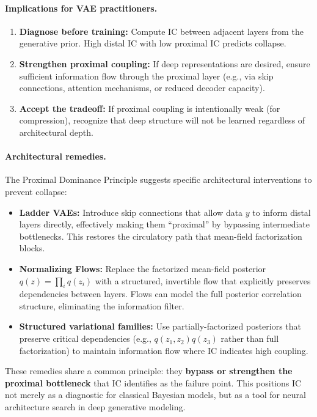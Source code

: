 \documentclass[10pt]{article} %
\theoremstyle{plain}
\theoremstyle{definition}
\begin{document}
\paragraph{Implications for VAE practitioners.}
\begin{enumerate}
    \item \textbf{Diagnose before training:} Compute IC between adjacent layers from the generative prior. High distal IC with low proximal IC predicts collapse.
    \item \textbf{Strengthen proximal coupling:} If deep representations are desired, ensure sufficient information flow through the proximal layer (e.g., via skip connections, attention mechanisms, or reduced decoder capacity).
    \item \textbf{Accept the tradeoff:} If proximal coupling is intentionally weak (for compression), recognize that deep structure will not be learned regardless of architectural depth.
\end{enumerate}

\paragraph{Architectural remedies.} The Proximal Dominance Principle suggests specific architectural interventions to prevent collapse:

\begin{itemize}
    \item \textbf{Ladder VAEs:} Introduce skip connections that allow data $y$ to inform distal layers directly, effectively making them ``proximal'' by bypassing intermediate bottlenecks. This restores the circulatory path that mean-field factorization blocks.
    
    \item \textbf{Normalizing Flows:} Replace the factorized mean-field posterior $q(z) = \prod_i q(z_i)$ with a structured, invertible flow that explicitly preserves dependencies between layers. Flows can model the full posterior correlation structure, eliminating the information filter.
    
    \item \textbf{Structured variational families:} Use partially-factorized posteriors that preserve critical dependencies (e.g., $q(z_1, z_2)q(z_3)$ rather than full factorization) to maintain information flow where IC indicates high coupling.
\end{itemize}

\noindent These remedies share a common principle: they \textbf{bypass or strengthen the proximal bottleneck} that IC identifies as the failure point. This positions IC not merely as a diagnostic for classical Bayesian models, but as a tool for neural architecture search in deep generative modeling.
\end{document}
